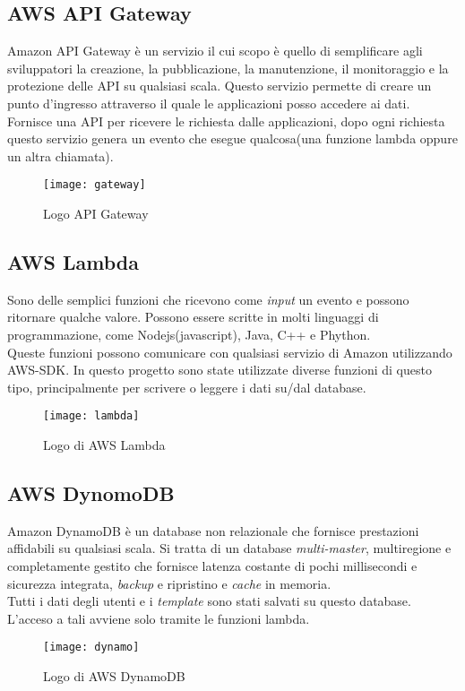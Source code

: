 \subsection{AWS API Gateway} Amazon API Gateway è un servizio il cui scopo è quello di semplificare agli sviluppatori
la creazione, la pubblicazione, la manutenzione, il monitoraggio e la protezione
delle \gls{API} su qualsiasi scala.
Questo servizio permette di creare un punto d'ingresso attraverso il quale le applicazioni posso accedere ai dati. Fornisce una API per ricevere le richiesta dalle applicazioni, dopo ogni richiesta questo servizio genera un evento che esegue qualcosa(una funzione lambda oppure un altra chiamata).
\begin{figure}[!h] 
	\centering 
	\texttt{[image: gateway]}
	\caption{Logo API Gateway}
\end{figure}

\subsection{AWS Lambda} 

Sono delle semplici funzioni che ricevono come \emph{input} un evento e possono ritornare qualche valore. Possono essere scritte in molti linguaggi di programmazione, come Nodejs(javascript), Java, C++ e Phython. 
\\

Queste funzioni possono comunicare con qualsiasi servizio di Amazon utilizzando \gls{AWS-SDK}. In questo progetto sono state utilizzate diverse funzioni di questo tipo, principalmente per scrivere o leggere i dati su/dal database.
\begin{figure}[!h] 
	\centering 
	\texttt{[image: lambda]}
	\caption{Logo di AWS Lambda}
\end{figure}  

\subsection{AWS DynomoDB} 
Amazon DynamoDB è un database non relazionale che fornisce prestazioni affidabili su qualsiasi scala. Si tratta di un database \emph{multi-master}, multiregione e completamente gestito che fornisce latenza costante di pochi millisecondi e sicurezza integrata, \emph{backup} e ripristino e \emph{cache} in memoria.
\\

 Tutti i dati degli utenti e i \emph{template} sono stati salvati su questo database. L'acceso a tali avviene solo tramite le funzioni lambda.   
\begin{figure}[!h] 
	\centering 
	\texttt{[image: dynamo]}
	\caption{Logo di AWS DynamoDB}
\end{figure}


